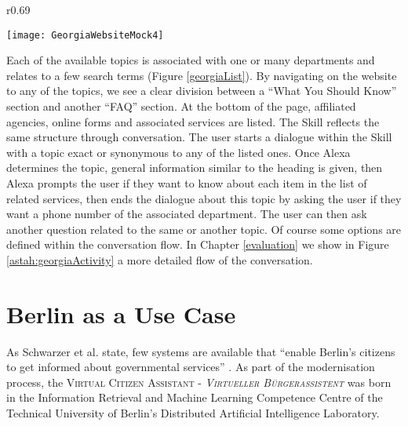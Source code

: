 \begin{wrapfigure}{r}{0.69\textwidth}
	\begin{center}	
	\caption[Georgia.gov Popular Topics]{Georgia.gov Popular Topics - Based on \href{https://georgia.gov/popular-topics}{georgia.gov/popular-topics}}
	\label{georgiaList}
	\centering
	\texttt{[image: GeorgiaWebsiteMock4]}
	\end{center}
\end{wrapfigure}




Each of the available topics is associated with one or many departments and relates to a few search terms (Figure \ref{georgiaList}). By navigating on the website to any of the topics, we see a clear division between a ``What You Should Know'' section and another ``FAQ'' section. At the bottom of the page, affiliated agencies, online forms and associated services are listed. The Skill reflects the same structure through conversation. The user starts a dialogue within the Skill with a topic exact or synonymous to any of the listed ones. Once Alexa determines the topic, general information similar to the heading is given, then Alexa prompts the user if they want to know about each item in the list of related services, then ends the dialogue about this topic by asking the user if they want a phone number of the associated department. The user can then ask another question related to the same or another topic. Of course some options are defined within the conversation flow. In Chapter \ref{evaluation} we show in Figure \ref{astah:georgiaActivity} a more detailed flow of the conversation.

















\chapter{Berlin as a Use Case}
\label{blnusecase}
As Schwarzer et al. state, few systems are available that ``enable Berlin’s citizens to get informed about governmental services'' \cite{lomm:gov}.
As part of the modernisation process, the \textsc{Virtual Citizen Assistant - \emph{Virtueller Bürgerassistent}} was born in %
the Information Retrieval and Machine Learning Competence Centre of the Technical University of Berlin's Distributed Artificial Intelligence Laboratory.

